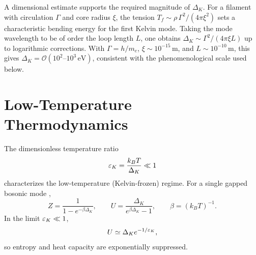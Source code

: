 \documentclass[pdflatex,sn-mathphys-num]{sn-jnl}
\begin{document}
        A dimensional estimate supports the required magnitude of $\Delta_K$. For a filament with circulation $\Gamma$ and core radius $\xi$, the tension $T_f \sim \rho \, \Gamma^2/(4\pi \xi^2)$ sets a characteristic bending energy for the first Kelvin mode. Taking the mode wavelength to be of order the loop length $L$, one obtains $\Delta_K \sim \Gamma^2/(4\pi \xi L)$ up to logarithmic corrections. With $\Gamma = h/m_e$, $\xi \sim 10^{-15}\,\mathrm{m}$, and $L \sim 10^{-10}\,\mathrm{m}$, this gives $\Delta_K = \mathcal{O}(10^2\text{--}10^3\,\mathrm{eV})$, consistent with the phenomenological scale used below.

    \section{Low-Temperature Thermodynamics}\label{sec:lowT}
        The dimensionless temperature ratio
        \[
            \varepsilon_K = \frac{k_B T}{\Delta_K} \ll 1
        \]
        characterizes the low-temperature (Kelvin-frozen) regime.
        For a single gapped bosonic mode \cite{Pathria2011},
        \begin{equation}
            Z = \frac{1}{1 - e^{-\beta\Delta_K}}, \qquad
            U = \frac{\Delta_K}{e^{\beta\Delta_K} - 1}, \qquad
            \beta = (k_B T)^{-1}.
        \end{equation}
        In the limit $\varepsilon_K \ll 1$,
        \begin{equation}
            U \simeq \Delta_K e^{-1/\varepsilon_K},
        \end{equation}
        so entropy and heat capacity are exponentially suppressed.
\end{document}
